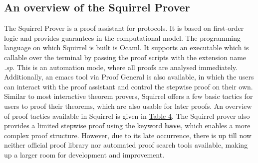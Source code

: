 \documentclass[conference]{IEEEtran}
\begin{document}
\subsection{An overview of the Squirrel Prover}
The Squirrel Prover is a proof assistant for protocols. It is based on first-order logic and provides guarantees in the computational model. The programming language on which Squirrel is built is Ocaml. It supports an executable which is callable over the terminal by passing the proof scripts with the extension name \textit{.sp}. This is an automation mode, where all proofs are analysed immediately. Additionally, an emacs tool via Proof General\cite{ProofGeneral} is also available, in which the users can interact with the proof assistant and control the stepwise proof on their  own. Similar to most interactive theorem provers, Squirrel offers a few basic tactics for users to proof their theorems, which are also usable for later proofs. An overview of proof tactics available in Squirrel is given in \hyperref[table:4]{Table 4}. The Squirrel prover also provides a limited stepwise proof using the keyword \textbf{have}, which enables a more complex proof structure. However, due to its late occurrence, there is up till now neither official proof library nor automated proof search tools available, making up a larger room for development and improvement.
\end{document}
